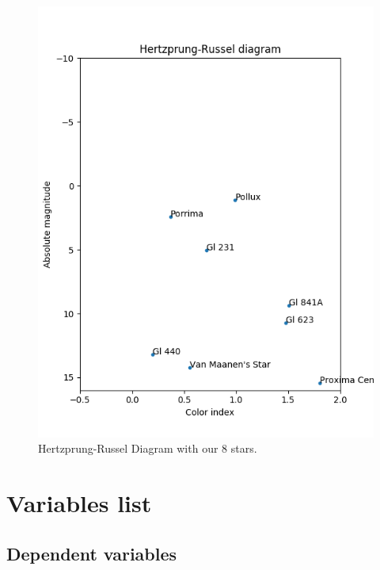 \documentclass{article}
\begin{document}
\begin{figure}[h]
\begin{minipage}[b]{0.45\textwidth}
      \includegraphics[width=\textwidth]{stretch.png}
      \caption{Hertzprung-Russel Diagram with our 8 stars.}
      \label{str}
    \end{minipage}
  \end{figure}
  
  
  \section{Variables list}
  
  \subsection{Dependent variables}
  
\end{document}
